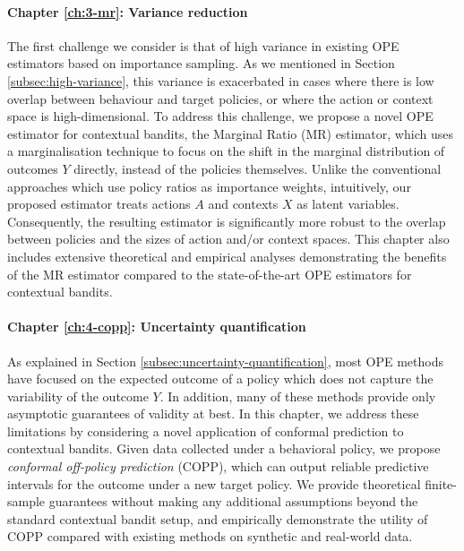 \paragraph*{Chapter \ref*{ch:3-mr}: Variance reduction \citep{taufiq2023marginal}}
The first challenge we consider is that of high variance in existing OPE estimators based on importance sampling. 
As we mentioned in Section \ref{subsec:high-variance}, this variance is exacerbated in cases where there is low overlap between behaviour and target policies, or where the action or context space is high-dimensional.
To address this challenge, we propose a novel OPE estimator for contextual bandits, the Marginal Ratio (MR) estimator, which uses a marginalisation technique to focus on the shift in the marginal distribution of outcomes $Y$
directly, instead of the policies themselves. 
Unlike the conventional approaches which use policy ratios as importance weights, intuitively, our proposed estimator treats actions $A$ and contexts $X$ as latent variables.
Consequently, the resulting estimator is significantly more robust to the overlap between policies and the sizes of action and/or context spaces.
This chapter also includes extensive theoretical and empirical analyses demonstrating the benefits of the MR estimator compared to the state-of-the-art OPE estimators for contextual bandits.


\paragraph*{Chapter \ref*{ch:4-copp}: Uncertainty quantification \citep{taufiq2022conformal}}
As explained in Section \ref{subsec:uncertainty-quantification}, most OPE methods have focused on the expected outcome of a policy which does not capture the variability of the outcome $Y$.
In addition, many of these methods provide only asymptotic guarantees of validity at best. 
In this chapter, we address these limitations by considering a novel application of conformal prediction \citep{vovk2005algorithmic} to contextual bandits. 
Given data collected under a behavioral policy, we propose \emph{conformal off-policy prediction} (COPP), which can output reliable predictive intervals for the outcome under a new target policy. We provide theoretical finite-sample guarantees without making any additional assumptions beyond the standard contextual bandit setup, and empirically demonstrate the utility of COPP compared with existing methods on synthetic and real-world data.

